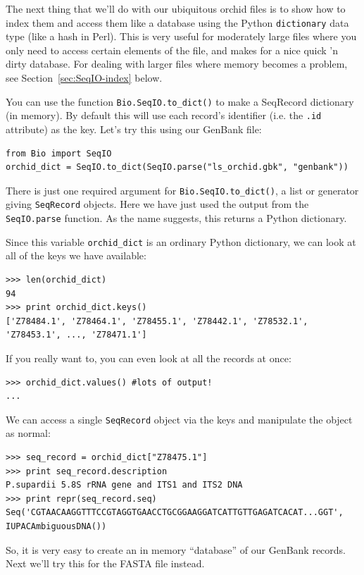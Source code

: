 \documentclass{report}
\begin{document}
The next thing that we'll do with our ubiquitous orchid files is to show how
to index them and access them like a database using the Python \verb|dictionary|
data type (like a hash in Perl). This is very useful for moderately large files
where you only need to access certain elements of the file, and makes for a nice
quick 'n dirty database. For dealing with larger files where memory becomes a
problem, see Section~\ref{sec:SeqIO-index} below.

You can use the function \verb|Bio.SeqIO.to_dict()| to make a SeqRecord dictionary
(in memory).  By default this will use each record's identifier (i.e. the \verb|.id|
attribute) as the key.  Let's try this using our GenBank file:

\begin{verbatim}
from Bio import SeqIO
orchid_dict = SeqIO.to_dict(SeqIO.parse("ls_orchid.gbk", "genbank"))
\end{verbatim}

There is just one required argument for \verb|Bio.SeqIO.to_dict()|, a list or
generator giving \verb|SeqRecord| objects. Here we have just used the output
from the \verb|SeqIO.parse| function. As the name suggests, this returns a
Python dictionary.

Since this variable \verb|orchid_dict| is an ordinary Python dictionary, we can look at all of the keys we have available:

\begin{verbatim}
>>> len(orchid_dict)
94
>>> print orchid_dict.keys()
['Z78484.1', 'Z78464.1', 'Z78455.1', 'Z78442.1', 'Z78532.1', 'Z78453.1', ..., 'Z78471.1']
\end{verbatim}

If you really want to, you can even look at all the records at once:
\begin{verbatim}
>>> orchid_dict.values() #lots of output!
...
\end{verbatim}

We can access a single \verb|SeqRecord| object via the keys and manipulate the object as normal:

\begin{verbatim}
>>> seq_record = orchid_dict["Z78475.1"]
>>> print seq_record.description
P.supardii 5.8S rRNA gene and ITS1 and ITS2 DNA
>>> print repr(seq_record.seq)
Seq('CGTAACAAGGTTTCCGTAGGTGAACCTGCGGAAGGATCATTGTTGAGATCACAT...GGT', IUPACAmbiguousDNA())
\end{verbatim}

So, it is very easy to create an in memory ``database'' of our GenBank records.  Next we'll try this for the FASTA file instead.
\end{document}
